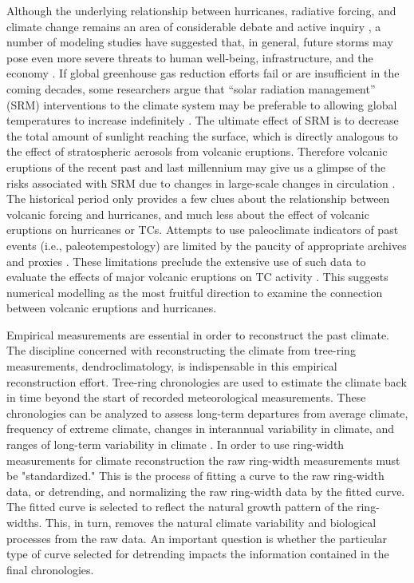 \documentclass[phd,tocprelim]{cornell}
\begin{document}
Although the underlying relationship between hurricanes, 
radiative forcing, and climate change remains an area of considerable debate
and active inquiry \cite{ting2015,elsner2006,msadek}, a number of 
modeling studies have suggested that, in general, future storms may pose even
more severe threats to human well-being, infrastructure, and the
economy \cite{IPCC2014c}. If global greenhouse gas reduction efforts 
fail or are insufficient in the coming decades, some researchers argue that
``solar radiation management'' (SRM) interventions to the climate system
may be preferable to allowing global temperatures to increase indefinitely 
\cite{govindasamy2000,caldeira2008,kravitz2014multi,macmartin2019}.
The ultimate effect of SRM is to decrease the total amount of sunlight 
reaching the surface, which is directly analogous to the effect of 
stratospheric aerosols from volcanic eruptions. Therefore volcanic 
eruptions of the recent past and last millennium may give us a glimpse 
of the risks associated with SRM due to changes in large-scale changes in 
circulation \cite{rasch2008}. The historical period only provides a few 
clues about the relationship between volcanic forcing and hurricanes, 
and much less about the effect of volcanic eruptions on hurricanes or TCs. 
Attempts to use paleoclimate indicators of past events (i.e., paleotempestology) 
are limited by the paucity of appropriate archives and proxies 
\cite{liu20081200,mann2009atlantic,donnelly2015}. These limitations preclude the
extensive use of such data to evaluate the effects of major volcanic
eruptions on TC activity \cite{oliva2018paleotempestology, 
yan2015tropical,korty2012variations}. This suggests numerical modelling
as the most fruitful direction to examine the connection between volcanic
eruptions and hurricanes. 

\par
Empirical measurements are essential in order to reconstruct the past
climate. The discipline concerned with reconstructing the climate from 
tree-ring measurements, dendroclimatology, is indispensable in this empirical 
reconstruction effort. Tree-ring chronologies are used to estimate the climate
back in time beyond the start of recorded meteorological measurements. 
These chronologies can be analyzed to assess long-term departures from
average climate, frequency of extreme climate, changes in interannual
variability in climate, and ranges of long-term variability in climate 
\cite{sheppard2010dendroclimatology}. In order to use ring-width measurements 
for climate reconstruction the raw ring-width measurements must 
be "standardized." This is the process of fitting a curve to the raw 
ring-width data, or detrending, and normalizing the raw ring-width data 
by the fitted curve. The fitted curve is selected to reflect the natural 
growth pattern of the ring-widths. This, in turn, removes the natural 
climate variability and biological processes from the raw data. An important 
question is whether the particular type of curve selected 
for detrending impacts the information contained in the final chronologies. 
\end{document}
